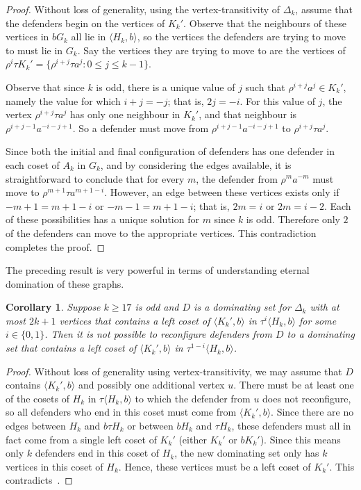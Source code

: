 \documentclass{amsart}
\newtheorem{cor}[thm]{Corollary}
\theoremstyle{remark}
\theoremstyle{definition}
\begin{document}
\begin{proof}
Without loss of generality, using the vertex-transitivity of $\Delta_k$, assume that the defenders begin on the vertices of $K_k'$. Observe that the neighbours of these vertices in $bG_k$ all lie in $\langle H_k,b\rangle$, so the vertices the defenders are trying to move to must lie in $G_k$. Say the vertices they are trying to move to are the vertices of $\rho^i\tau K_k'=\{\rho^{i+j}\tau a^{j}: 0 \le j \le k-1\}$.

Observe that since $k$ is odd, there is a unique value of $j$ such that $\rho^{i+j}a^j \in K_k'$, namely the value for which $i+j=-j$; that is, $2j=-i$. For this value of $j$, the vertex $\rho^{i+j}\tau a^j$ has only one neighbour in $K_k'$, and that neighbour is $\rho^{i+j-1}a^{-i-j+1}$. So a defender must move from $\rho^{i+j-1}a^{-i-j+1}$ to $\rho^{i+j}\tau a^j$. 

Since both the initial and final configuration of defenders has one defender in each coset of $A_k$ in $G_k$, and by considering the edges available, it is straightforward to conclude that for every $m$, the defender from $\rho^ma^{-m}$ must move to $\rho^{m+1}\tau a^{m+1-i}$. However, an edge between these vertices exists only if $-m+1=m+1-i$ or $-m-1=m+1-i$; that is, $2m=i$ or $2m=i-2$. Each of these possibilities has a unique solution for $m$ since $k$ is odd. Therefore only $2$ of the defenders can move to the appropriate vertices. This contradiction completes the proof.
\end{proof}

The preceding result is very powerful in terms of understanding eternal domination of these graphs.

\begin{cor}\label{cant-move}
Suppose $k \ge 17$ is odd and $D$ is a dominating set for $\Delta_k$ with at most $2k+1$ vertices that contains a left coset of $\langle K_k',b\rangle$ in $\tau^i\langle H_k,b\rangle$ for some $i \in \{0,1\}$. Then it is not possible to reconfigure defenders from $D$ to a dominating set that contains a left coset of $\langle K_k',b\rangle$ in $\tau^{1-i}\langle H_k,b\rangle$.
\end{cor}

\begin{proof}
Without loss of generality using vertex-transitivity, we may assume that $D$ contains $\langle K_k', b\rangle$ and possibly one additional vertex $u$.
There must be at least one of the cosets of $H_k$ in $\tau\langle H_k,b\rangle$ to which the defender from $u$ does not reconfigure, so all defenders who end in this coset must come from $\langle K_k',b\rangle$. Since there are no edges between $H_k$ and $b\tau H_k$ or between $bH_k$ and $\tau H_k$, 
these defenders must all in fact come from a single left coset of $K_k'$ (either $K_k'$ or $bK_k'$). Since this means only $k$ defenders end in this coset of $H_k$, the new dominating set only has $k$ vertices in this coset of $H_k$. Hence, these vertices must be a left coset of $K_k'$. This contradicts~.
\end{proof}
\end{document}
